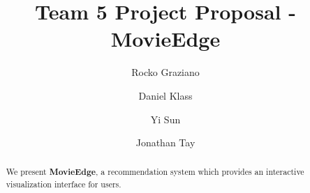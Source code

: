 \documentclass[sigchi, 12pt, nonacm=true, timestamp=true, screen=true]{acmart}
\begin{document}
\title{Team 5 Project Proposal - MovieEdge}


\author{Rocko Graziano}
\author{Daniel Klass}
\author{Yi Sun}
\author{Jonathan Tay}



\begin{abstract}
	We present \textbf{MovieEdge}, a recommendation system which provides an interactive visualization interface for users.
\end{abstract}
\end{document}
